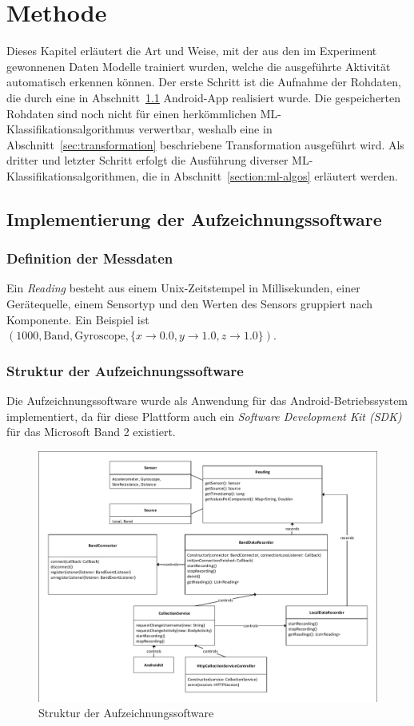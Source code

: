 \chapter{Methode}
\label{chap:method}
Dieses Kapitel erläutert die Art und Weise, mit der aus den im Experiment gewonnenen Daten Modelle trainiert wurden, welche die ausgeführte Aktivität automatisch erkennen können. Der erste Schritt ist die Aufnahme der Rohdaten, die durch eine in Abschnitt~\ref{sec:android-app} Android-App realisiert wurde. Die gespeicherten Rohdaten sind noch nicht für einen herkömmlichen ML-Klassifikationsalgorithmus verwertbar, weshalb eine in Abschnitt~\ref{sec:transformation} beschriebene Transformation ausgeführt wird. Als dritter und letzter Schritt erfolgt die Ausführung diverser ML-Klassifikationsalgorithmen, die in Abschnitt~\ref{section:ml-algos} erläutert werden.

\section{Implementierung der Aufzeichnungssoftware}
\label{sec:android-app}
\subsection{Definition der Messdaten}
\begin{definition}
Ein \textit{Reading} besteht aus einem Unix-Zeitstempel in Millisekunden, einer Gerätequelle, einem Sensortyp und den Werten des Sensors gruppiert nach Komponente. Ein Beispiel ist $(1000, \text{Band}, \text{Gyroscope}, \{x \to 0.0, y \to 1.0, z \to 1.0\})$.
\end{definition}
\subsection{Struktur der Aufzeichnungssoftware}
Die Aufzeichnungssoftware wurde als Anwendung für das Android-Betriebssystem implementiert, da für diese Plattform auch ein \textit{Software Development Kit (SDK)} für das Microsoft Band 2 existiert.
\begin{figure}[htb]
\centering
\includegraphics[width=160mm, clip, trim=1mm 1mm 1mm 1mm]{img/app-structure}
\caption{Struktur der Aufzeichnungssoftware}
\label{fig:app-structure}
\end{figure}

